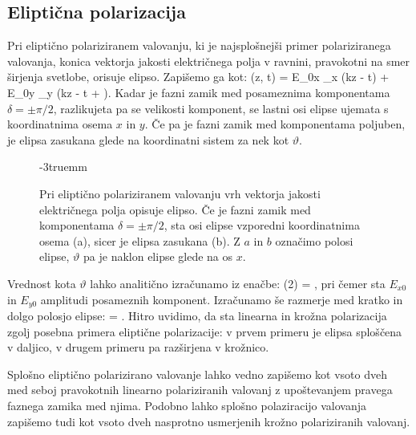 \subsection*{Eliptična polarizacija}
Pri eliptično polariziranem valovanju, ki je najsplošnejši primer polariziranega valovanja,
konica vektorja jakosti električnega polja v ravnini, pravokotni na smer širjenja svetlobe, orisuje elipso. 
Zapišemo ga kot:
\beq
{} (z, t) = E_{0x} _x \cos \left(kz - \omega t\right)
+ E_{0y} _y \cos \left(kz - \omega t + \delta\right)\!.
\label{eq:elipticnapol}
\eeq
Kadar je fazni zamik med posameznima komponentama $\delta = \pm \pi/2$, razlikujeta
pa se velikosti komponent, se lastni osi elipse ujemata s koordinatnima
osema $x$ in $y$. Če pa je fazni zamik med komponentama poljuben, je elipsa
zasukana glede na koordinatni sistem za nek kot $\vartheta$. 
\begin{figure}[h]
\centering
\def\svgwidth{120truemm} 

\caption{Pri eliptično polariziranem valovanju vrh vektorja
jakosti električnega polja opisuje elipso. Če je fazni zamik med komponentama
$\delta = \pm \pi/2$, sta osi elipse vzporedni koordinatnima osema (a), sicer
je elipsa zasukana (b). Z $a$ in $b$ označimo polosi elipse, $\vartheta$ pa je
naklon elipse glede na os $x$.}
\label{fig:03_elipspol}
\vglue-3truemm
\end{figure}

Vrednost 
kota $\vartheta$ lahko analitično izračunamo iz enačbe:
\beq
\tan (2\vartheta) = ,
\label{eq:elipsatheta}
\eeq
pri čemer sta $E_{x0}$ in $E_{y0}$ amplitudi posameznih komponent.
Izračunamo še
razmerje med kratko in dolgo polosjo elipse:
\beq
{} = .
\label{eq:elipsaba}
\eeq
Hitro uvidimo, da sta linearna in krožna polarizacija zgolj posebna
primera eliptične polarizacije: v prvem primeru je elipsa sploščena v daljico, 
v drugem primeru pa razširjena v krožnico. 

Splošno eliptično polarizirano valovanje lahko vedno
zapišemo kot vsoto dveh med seboj pravokotnih
linearno polariziranih valovanj z upoštevanjem pravega faznega zamika med njima.
Podobno lahko splošno polaziracijo valovanja zapišemo tudi kot vsoto 
dveh nasprotno usmerjenih krožno polariziranih valovanj.

